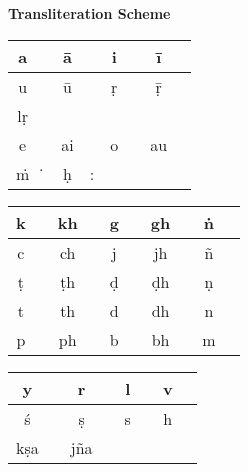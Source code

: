 \thispagestyle{empty}
\begin{center}
{\LARGE\bfseries Transliteration Scheme}
\vskip 30pt

\bgroup
\fontsize{11}{14pt}\selectfont
\renewcommand{\arraystretch}{1.5}
\begin{tabular}{|c|c!{\vrule width 0.8pt}c|c!{\vrule width 0.8pt}c|c!{\vrule width 0.8pt}c|c|}
\hline
a &  & ā &  & i &  & ī & \\
\hline
u &      & ū &  & ṛ &  & ṝ &  \\
\hline
lṛ &    &     &                       &     &                       &      & \\
\hline
e &  & ai &  & o &  & au & \\
\hline
ṁ &  ‍\.{\phantom{i}}              & ḥ  & :         &   &            &   & \\  	
\hline
\end{tabular}
\vskip 20pt

\begin{tabular}{|c|c!{\vrule width 0.8pt}c|c!{\vrule width 0.8pt}c|c!{\vrule width 0.8pt}c|c!{\vrule width 0.8pt}c|c|}
\hline
k &  & kh &  & g &  & gh &  & ṅ & \\
\hline
c &  & ch &  & j &  & jh &   & ñ &  \\
\hline
ṭ &  & ṭh &  & ḍ &   & ḍh &  & ṇ &   \\
\hline
t &   & th &   & d &  & dh &   & n &  \\
\hline
p &  & ph &  & b &  & bh &   & m &  \\ 
\hline
\end{tabular}
\vskip 20pt

\begin{tabular}{|c|c!{\vrule width 0.8pt}c|c!{\vrule width 0.8pt}c|c!{\vrule width 0.8pt}c|c|}
\hline
y &      & r   &  & l &  & v &  \\
\hline
ś &    & ṣ   &  & s &  & h &  \\
\hline
kṣa &  & jña &  &    &                      &      &  \\
\hline
\end{tabular}
\egroup
\end{center}
